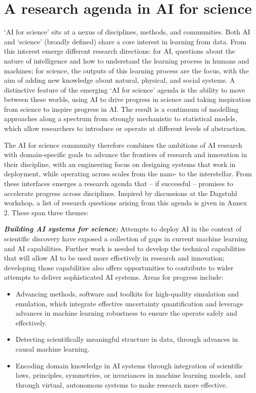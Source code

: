 \section{A research agenda in AI for
science}\label{a-research-agenda-in-ai-for-science}

`AI for science' sits at a nexus of disciplines, methods, and
communities. Both AI and `science' (broadly defined) share a core
interest in learning from data. From this interest emerge different
research directions: for AI, questions about the nature of intelligence
and how to understand the learning process in humans and machines; for
science, the outputs of this learning process are the focus, with the
aim of adding new knowledge about natural, physical, and social systems.
A distinctive feature of the emerging `AI for science' agenda is the
ability to move between these worlds, using AI to drive progress in
science and taking inspiration from science to inspire progress in AI.
The result is a continuum of modelling approaches along a spectrum from
strongly mechanistic to statistical models, which allow researchers to
introduce or operate at different levels of abstraction.

The AI for science community therefore combines the ambitions of AI
research with domain-specific goals to advance the frontiers of research
and innovation in their discipline, with an engineering focus on
designing systems that work in deployment, while operating across scales
from the nano- to the interstellar. From these interfaces emerges a
research agenda that -- if successful -- promises to accelerate progress
across disciplines. Inspired by discussions at the Dagstuhl workshop, a
list of research questions arising from this agenda is given in Annex 2.
These span three themes:

\emph{\textbf{Building AI systems for science:}} Attempts to deploy AI
in the context of scientific discovery have exposed a collection of gaps
in current machine learning and AI capabilities. Further work is needed
to develop the technical capabilities that will allow AI to be used more
effectively in research and innovation; developing those capabilities
also offers opportunities to contribute to wider attempts to deliver
sophisticated AI systems. Areas for progress include:

\begin{itemize}
\item
  Advancing methods, software and toolkits for high-quality simulation
  and emulation, which integrate effective uncertainty quantification
  and leverage advances in machine learning robustness to ensure the
  operate safely and effectively.
\item
  Detecting scientifically meaningful structure in data, through
  advances in causal machine learning.
\item
  Encoding domain knowledge in AI systems through integration of
  scientific laws, principles, symmetries, or invariances in machine
  learning models, and through virtual, autonomous systems to make
  research more effective.
\end{itemize}

